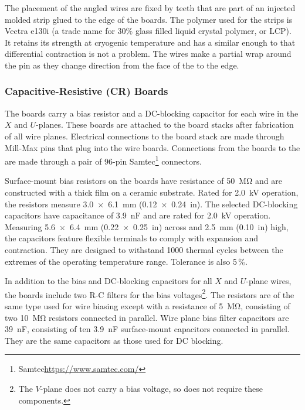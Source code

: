 The placement of the angled wires are fixed by teeth that are part of an injected molded strip glued to the edge of the \frfour boards.  The polymer used for the strips is Vectra e130i (a trade name for 30$\%$ glass filled liquid crystal polymer, or LCP). It retains its strength at cryogenic temperature and has a  similar enough to \frfour that differential contraction is not a problem.  The wires make a partial wrap around the pin as they change direction from the face of the  to the edge.


\subsubsection{Capacitive-Resistive (CR) Boards}
\label{sec:crboards}

The  boards carry a bias resistor and a DC-blocking capacitor for each wire in the $X$ and $U$-planes. These boards are attached to the board stacks after fabrication of all wire planes.   Electrical connections to the board stack are made through Mill-Max pins that plug into the wire boards. Connections from the  boards to the  are made through a pair of \num{96}-pin Samtec\footnote{Samtec\texttrademark \url{https://www.samtec.com/}} connectors.

Surface-mount bias resistors on the  boards have resistance of \SI{50}{\mega\ohm} and are constructed with a thick film on a ceramic substrate. Rated for \SI{2.0}{kV} operation, the resistors measure \SI{3.0 x 6.1}{mm} (\SI{0.12 x 0.24}{in}). The selected DC-blocking capacitors have capacitance of \SI{3.9}{nF} and are rated for \SI{2.0}{kV} operation. Measuring \SI{5.6 x 6.4}{mm} (\SI{0.22 x 0.25}{in}) across and
\SI{2.5}{mm} (\SI{0.10}{in}) high,  
the capacitors feature flexible terminals to comply with  expansion and contraction. They are designed to withstand \num{1000} thermal cycles between the extremes of the operating temperature range. Tolerance is also \num{5}\,\%.

In addition to the bias and DC-blocking capacitors for all $X$ and $U$-plane wires, the  boards include two R-C filters for the bias voltages\footnote{The $V$-plane does not carry a bias voltage, so does not require these components.}. The resistors are of the same type used for wire biasing except with a resistance of \SI{5}{\mega\ohm}, consisting of two \SI{10}{\mega\ohm} resistors connected in parallel. Wire plane bias filter capacitors are \SI{39}{nF}, consisting of ten \SI{3.9}{nF} surface-mount capacitors connected in parallel. They are the same capacitors as those used for DC blocking.

